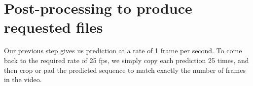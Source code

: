 \documentclass[10pt,twocolumn,letterpaper]{article}
\begin{document}
\section{Post-processing to produce requested files}

Our previous step gives us prediction at a rate of 1 frame per second. To come
back to the required rate of 25 fps, we simply copy each prediction 25 times, and
then crop or pad the predicted sequence to match exactly the number of frames in
the video.












{\small


}
\end{document}
